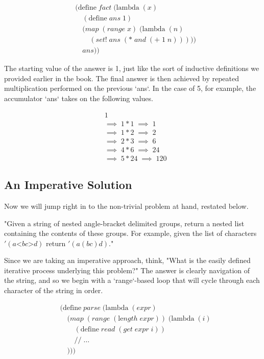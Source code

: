 \begin{align*}
& (\text{define} \; fact \; (\text{lambda} \; (x)
\\& \quad (\text{define} \; ans \; 1)
\\& \quad (map \; (range \; x) \; (\text{lambda} \; (n)
\\& \qquad (set! \; ans \; (* \; and \; (+ \; 1 \; n)))))
\\& \quad ans))
\end{align*}

The starting value of the answer is 1, just like the sort of inductive definitions we 
provided earlier in the book. The final answer is then achieved by repeated 
multiplication performed on the previous `ans`. In the case of 5, for example, the 
accumulator `ans` takes on the following values.

\begin{align*}
& 1
\\& \implies \; 1*1 \; \implies \; 1
\\& \implies \; 1*2 \; \implies \; 2
\\& \implies \; 2*3 \; \implies \; 6
\\& \implies \; 4*6 \; \implies \; 24
\\& \implies \; 5*24 \; \implies \; 120
\end{align*}

\subsection{An Imperative Solution}
Now we will jump right in to the non-trivial problem at hand, restated below.

"Given a string of nested angle-bracket delimited groups, return a
nested list containing the contents of these groups. For example,
given the list of characters $'(a \text{<} b c \text{>} d)$ return $'(a (b c) d)$."

Since we are taking an imperative approach, think, "What is the easily defined iterative 
process underlying this problem?" The answer is clearly navigation of the string, and so 
we begin with a `range`-based loop that will cycle through each character of the string 
in order.

\begin{align*}
& (\text{define} \; parse \; (\text{lambda} \; (expr) \; 
\\& \quad (map \; (range \; (\text{le}ngth \; expr)) \; (\text{lambda} \; (i)
\\& \qquad (\text{define} \; read \; (get \; expr \; i))
\\& \qquad // \; \dots
\\& \quad )))
\end{align*}

